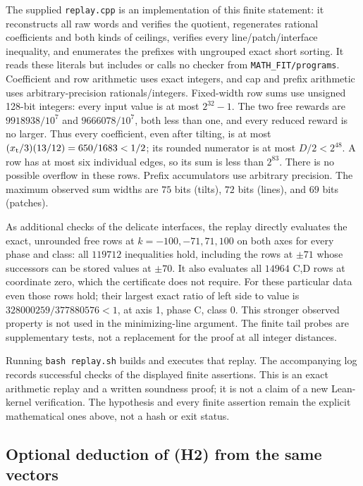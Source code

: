 The supplied \texttt{replay.cpp} is an implementation of this
finite statement: it reconstructs all raw words and verifies
the quotient, regenerates rational coefficients and both kinds
of ceilings, verifies every line/patch/interface inequality,
and enumerates the prefixes with ungrouped exact short sorting.
It reads these literals but includes or calls no checker from
\texttt{MATH\_FIT/programs}.  Coefficient and row arithmetic
uses exact integers, and cap and prefix arithmetic uses
arbitrary-precision rationals/integers.  Fixed-width row sums
use unsigned 128-bit integers: every input value is at most
$2^{32}-1$.  The two free rewards are $9918938/10^7$ and
$9666078/10^7$, both less than one, and every reduced reward
is no larger.  Thus every coefficient, even after tilting,
is at most $(x_{\rm t}/3)(13/12)=650/1683<1/2$;
its rounded numerator is at most $D/2<2^{48}$.
A row has at most six individual edges, so
its sum is less than $2^{83}$.  There is no possible overflow
in these rows.  Prefix accumulators use arbitrary precision.
The maximum observed sum widths are $75$ bits (tilts), $72$
bits (lines), and $69$ bits (patches).

As additional checks of the delicate interfaces, the replay
directly evaluates the exact, unrounded free rows at
$k=-100,-71,71,100$ on both axes for every phase and class:
all $119712$ inequalities hold, including the rows at $\pm71$
whose successors can be stored values at $\pm70$.
It also evaluates all $14964$ C,D rows at coordinate zero,
which the certificate does not require.  For these particular
data even those rows hold; their largest exact ratio of left
side to value is $328000259/377880576<1$, at axis 1,
phase C, class 0.  This stronger observed property is not
used in the minimizing-line argument.  The finite tail probes
are supplementary tests, not a replacement for the proof at
all integer distances.

Running \texttt{bash replay.sh} builds and executes that replay.
The accompanying log records successful checks of the displayed
finite assertions.  This is an exact arithmetic replay and a
written soundness proof; it is not a claim of a new Lean-kernel
verification.  The hypothesis and every finite assertion remain
the explicit mathematical ones above, not a hash or exit status.

\subsection{Optional deduction of (H2) from the same vectors}


